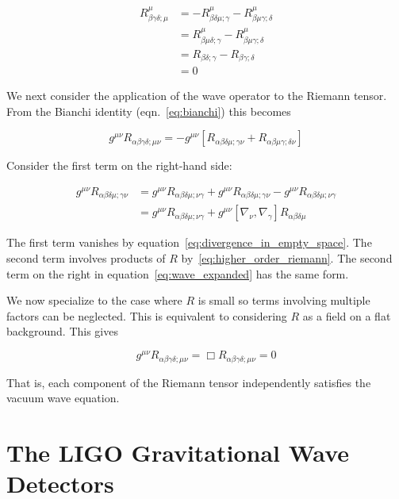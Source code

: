 \begin{align}
\label{eq:divergence_in_empty_space}
R^\mu_{\beta\gamma\delta;\mu} &= 
-R^\mu_{\beta\delta\mu;\gamma}  
-R^\mu_{\beta\mu\gamma;\delta} \\ 
&= R^\mu_{\beta\mu\delta;\gamma}  
-R^\mu_{\beta\mu\gamma;\delta} \\
&= R_{\beta\delta;\gamma}  
-R_{\beta\gamma;\delta} \\
&= 0
\end{align}

We next consider the application of the wave operator to the Riemann
tensor.  From the Bianchi identity (eqn.~\ref{eq:bianchi}) this becomes

\begin{equation*}
\label{eq:wave_expanded}
g^{\mu\nu} R_{\alpha\beta\gamma\delta;\mu\nu}
= - g^{\mu\nu}
\left[R_{\alpha\beta\delta\mu;\gamma\nu}
+ R_{\alpha\beta\mu\gamma;\delta\nu} \right]
\end{equation*}

Consider the first term on the right-hand side:

\begin{align*}
g^{\mu\nu} R_{\alpha\beta\delta\mu;\gamma\nu}
&= g^{\mu\nu} R_{\alpha\beta\delta\mu;\nu\gamma}
+ g^{\mu\nu} R_{\alpha\beta\delta\mu;\gamma\nu}
- g^{\mu\nu} R_{\alpha\beta\delta\mu;\nu\gamma} \\
&= g^{\mu\nu} R_{\alpha\beta\delta\mu;\nu\gamma}
+ g^{\mu\nu} 
\left[\nabla_\nu,\nabla_\gamma\right] R_{\alpha\beta\delta\mu}
\end{align*}

The first term vanishes by
equation~\ref{eq:divergence_in_empty_space}.  The second term involves
products of $R$ by~\ref{eq:higher_order_riemann}.  The second term on
the right in equation~\ref{eq:wave_expanded} has the same form.

We now specialize to the case where $R$ is small so terms
involving multiple factors can be neglected.  This is equivalent to
considering $R$ as a field on a flat background.  This gives

\begin{equation}
\label{eq:riemann_wave}
g^{\mu\nu}
R_{\alpha\beta\gamma\delta;\mu\nu}
=
\Box R_{\alpha\beta\gamma\delta;\mu\nu}
= 0
\end{equation}

That is, each component of the Riemann tensor independently 
satisfies the vacuum wave equation.

\section{The LIGO Gravitational Wave Detectors}
\label{sec:ligo_detectors}


